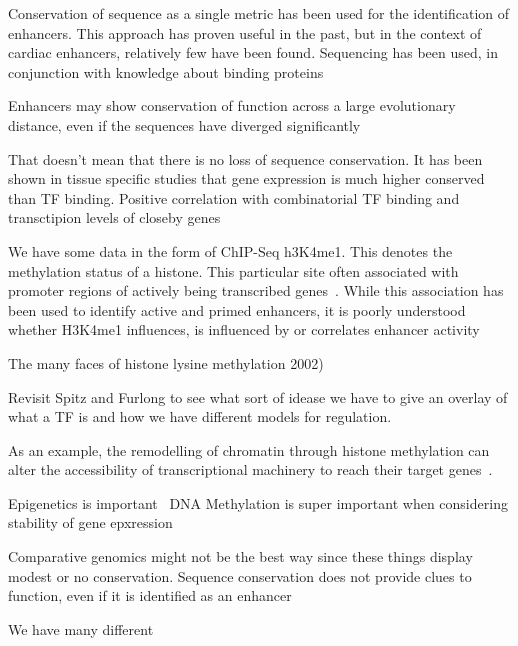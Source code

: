         
        Conservation of sequence as a single metric has been used for the identification of enhancers. This approach has proven useful in the past, but in the context of cardiac enhancers, relatively few have been found. Sequencing has been used, in conjunction with knowledge about binding proteins~\cite{blow2010chip}
        
        Enhancers may show conservation of function across a large evolutionary distance, even if the sequences have diverged significantly~\cite{tautz2000evolution}
        
        That doesn't mean that there is no loss of sequence conservation. It has been shown in tissue specific studies that gene expression is much higher conserved than TF binding. Positive correlation with combinatorial TF binding and transctipion levels of closeby genes~\cite{wong2014decoupling}
        
        We have some data in the form of ChIP-Seq h3K4me1. This denotes the methylation status of a histone. This particular site often associated with promoter regions of actively being transcribed genes~\cite{barski2007high}. 
        While this association has been used to identify active and primed enhancers, it is poorly understood whether H3K4me1 influences, is influenced by or correlates enhancer activity~\cite{rada2018h3k4me1}
        
        The many faces of histone lysine methylation 2002)
        
        Revisit Spitz and Furlong to see what sort of idease we have to give an overlay of what a TF is and how we have different models for regulation. 
        
       
        
        
        
        As an example, the remodelling of chromatin through histone methylation can alter the accessibility of transcriptional machinery to reach their target genes~\cite{gibney2010epigenetics, holoch2015rna }. 
        
        Epigenetics is important~\cite{holliday2006epigenetics}
        DNA Methylation is super important when considering stability of gene epxression~\cite{jaenisch2003epigenetic}
        
        Comparative genomics might not be the best way since these things display modest or no conservation. Sequence conservation does not provide clues to function, even if it is identified as an enhancer~\cite{pennacchio2013enhancers}
        
        
        We have many different 
